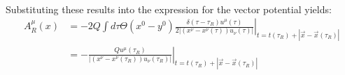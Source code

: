 \documentclass[12pt,a4]{article}
\begin{document}
\begin{enumerate}
\begin{enumerate}
\begin{align*}
        \end{align*}
        Substituting these results into the expression for the vector potential yields:
        \begin{align*}
          A^\mu_R(x) &= - 2 Q \left.\int d\tau \Theta(x^{0} - y^{0})\frac{\delta(\tau - \tau_R) u^\mu(\tau)}{2\left|(x^\nu - x^{\nu}(\tau))u_{\nu}(\tau)\right|} \right|_{t = t(\tau_R) + |\vec{x} - \vec{x}(\tau_R)|}\\
                     &= - \left.\frac{Qu^\mu(\tau_R)}{\left|(x^\nu - x^{\nu}(\tau_R))u_{\nu}(\tau_R)\right|} \right|_{t = t(\tau_R) + |\vec{x} - \vec{x}(\tau_R)|}
        \end{align*}

\end{enumerate}
\end{enumerate}
\end{document}
